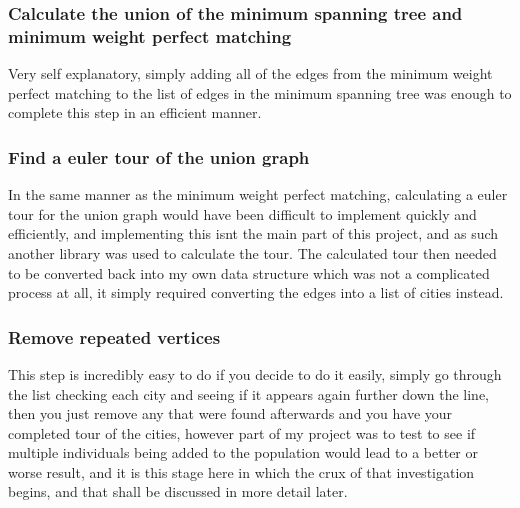 \documentclass[11pt,a4paper,titlepage]{article}
\begin{document}
\subsubsection{Calculate the union of the minimum spanning tree and minimum weight perfect matching}
Very self explanatory, simply adding all of the edges from the minimum weight perfect matching to the list of edges in the minimum spanning tree was enough to complete this step in an efficient manner.

\subsubsection{Find a euler tour of the union graph}
In the same manner as the minimum weight perfect matching, calculating a euler tour for the union graph would have been difficult to implement quickly and efficiently, and implementing this isnt the main part of this project, and as such another library was used \cite{HeirEulTour} to calculate the tour. The calculated tour then needed to be converted back into my own data structure which was not a complicated process at all, it simply required converting the edges into a list of cities instead.

\subsubsection{Remove repeated vertices}
This step is incredibly easy to do if you decide to do it easily, simply go through the list checking each city and seeing if it appears again further down the line, then you just remove any that were found afterwards and you have your completed tour of the cities, however part of my project was to test to see if multiple individuals being added to the population would lead to a better or worse result, and it is this stage here in which the crux of that investigation begins, and that shall be discussed in more detail later.
\end{document}
